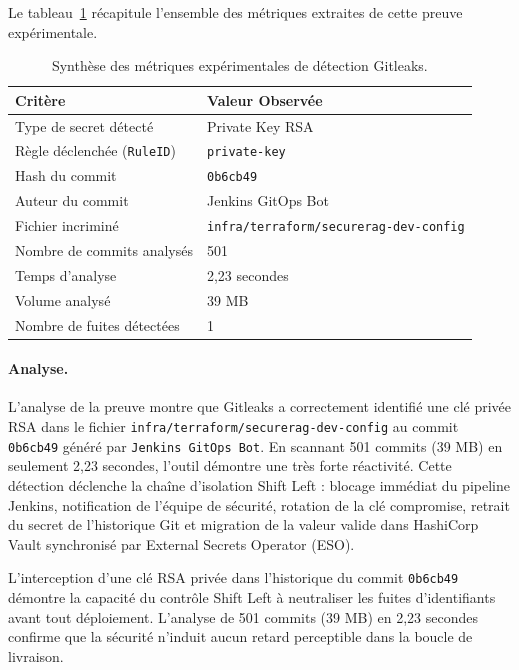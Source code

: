 Le tableau~\ref{tab:gitleaks_experimental_summary} récapitule l'ensemble des métriques extraites de cette preuve expérimentale.

\begin{table}[H]
\centering
\small
\begin{tabular}{@{}ll@{}}
\toprule
\textbf{Critère} & \textbf{Valeur Observée} \\
\midrule
Type de secret détecté & Private Key RSA \\
Règle déclenchée (\texttt{RuleID}) & \texttt{private-key} \\
Hash du commit & \texttt{0b6cb49} \\
Auteur du commit & Jenkins GitOps Bot \\
Fichier incriminé & \texttt{infra/terraform/securerag-dev-config} \\
Nombre de commits analysés & 501 \\
Temps d'analyse & 2,23 secondes \\
Volume analysé & 39 MB \\
Nombre de fuites détectées & 1 \\
\bottomrule
\end{tabular}
\caption{Synthèse des métriques expérimentales de détection Gitleaks.}
\label{tab:gitleaks_experimental_summary}
\end{table}

\paragraph{Analyse.}
L'analyse de la preuve montre que Gitleaks a correctement identifié une clé privée RSA dans le fichier \texttt{infra/terraform/securerag-dev-config} au commit \texttt{0b6cb49} généré par \texttt{Jenkins GitOps Bot}. En scannant 501 commits (39 MB) en seulement 2,23 secondes, l'outil démontre une très forte réactivité. Cette détection déclenche la chaîne d'isolation Shift Left : blocage immédiat du pipeline Jenkins, notification de l'équipe de sécurité, rotation de la clé compromise, retrait du secret de l'historique Git et migration de la valeur valide dans HashiCorp Vault synchronisé par External Secrets Operator (ESO).

\begin{tcolorbox}[colback=LightGray!30, colframe=clrBlue, arc=3pt, title={\small\bfseries Synthèse d'analyse critique — Gitleaks}]
L'interception d'une clé RSA privée dans l'historique du commit \texttt{0b6cb49} démontre la capacité du contrôle Shift Left à neutraliser les fuites d'identifiants avant tout déploiement. L'analyse de 501 commits (39 MB) en 2,23 secondes confirme que la sécurité n'induit aucun retard perceptible dans la boucle de livraison.
\end{tcolorbox}

